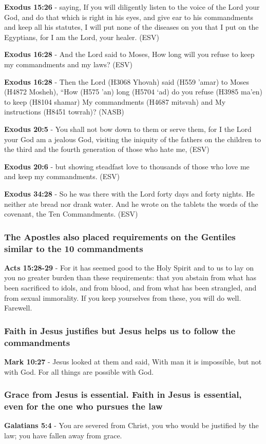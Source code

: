 \documentclass[11pt]{article}
\begin{document}
\textbf{Exodus 15:26} - saying, If you will diligently listen to the voice of the Lord your God, and do that which is right in his eyes, and give ear to his commandments and keep all his statutes, I will put none of the diseases on you that I put on the Egyptians, for I am the Lord, your healer. (ESV)

\textbf{Exodus 16:28} - And the Lord said to Moses, How long will you refuse to keep my commandments and my laws? (ESV)

\textbf{Exodus 16:28} - Then the Lord (H3068 Yhovah) said (H559 'amar) to Moses (H4872 Mosheh), “How (H575 'an) long (H5704 `ad) do you refuse (H3985 ma'en) to keep (H8104 shamar) My commandments (H4687 mitsvah) and My instructions (H8451 towrah)? (NASB)

\textbf{Exodus 20:5} - You shall not bow down to them or serve them, for I the Lord your God am a jealous God, visiting the iniquity of the fathers on the children to the third and the fourth generation of those who hate me, (ESV)

\textbf{Exodus 20:6} - but showing steadfast love to thousands of those who love me and keep my commandments. (ESV)

\textbf{Exodus 34:28} - So he was there with the Lord forty days and forty nights. He neither ate bread nor drank water. And he wrote on the tablets the words of the covenant, the Ten Commandments. (ESV)

\subsubsection{The Apostles also placed requirements on the Gentiles similar to the 10 commandments}
\label{sec:orga53b634}
\textbf{Acts 15:28-29} - For it has seemed good to the Holy Spirit and to us to lay on you no greater burden than these requirements: that you abstain from what has been sacrificed to idols, and from blood, and from what has been strangled, and from sexual immorality. If you keep yourselves from these, you will do well. Farewell.

\subsubsection{Faith in Jesus justifies but Jesus helps us to follow the commandments}
\label{sec:org0d44257}
\textbf{Mark 10:27} - Jesus looked at them and said, With man it is impossible, but not with God. For all things are possible with God.

\subsubsection{Grace from Jesus is essential. Faith in Jesus is essential, even for the one who pursues the law}
\label{sec:orgfae62bb}
\textbf{Galatians 5:4} - You are severed from Christ, you who would be justified by the law; you have fallen away from grace.
\end{document}
